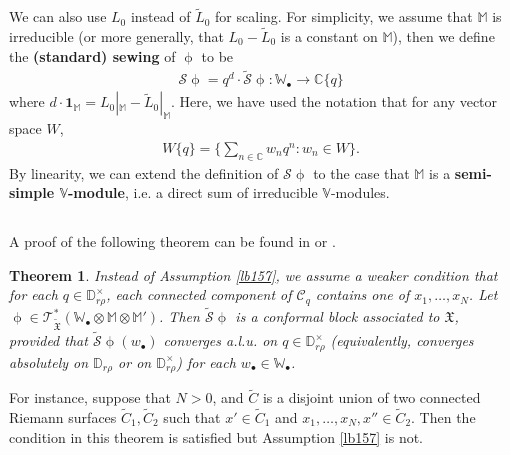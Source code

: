 \documentclass[12pt,a4paper,notitlepage]{article}
\theoremstyle{definition}
\theoremstyle{plain}
\newtheorem{thm}[df]{Theorem}
\newcommand{\fk}{\mathfrak}
\newcommand{\mc}{\mathcal}
\newcommand{\wtd}{\widetilde}
\newcommand{\id}{\mathbf{1}}
\newcommand{\scr}{\mathscr}
\newcommand{\blt}{\bullet}
\newcommand{\Vbb}{\mathbb V}
\newcommand{\Wbb}{\mathbb W}
\newcommand{\Mbb}{\mathbb M}
\newcommand{\Cbb}{\mathbb C}
\newcommand{\Dbb}{\mathbb D}
\numberwithin{equation}{section}
\begin{document}
We can also use $L_0$ instead of $\wtd L_0$ for scaling. For simplicity, we assume that $\Mbb$ is irreducible (or more generally, that $L_0-\wtd L_0$ is a constant on $\Mbb$), then we define the \textbf{(standard) sewing} of $\upphi$ to be \index{S@$\mc S\upphi$, the standard sewing}
\begin{align}
\mc S\upphi=q^d\cdot\wtd{\mc S}\upphi:\Wbb_\blt\rightarrow\Cbb\{q\} 
\end{align} 
where $d\cdot \id_\Mbb=L_0|_\Mbb-\wtd L_0|_\Mbb$. Here, we have used the notation that for any vector space $W$, 
\begin{align*}
W\{q\}=\Big\{\sum_{n\in\Cbb} w_nq^n:w_n\in W\Big\}.
\end{align*}
By linearity, we can extend the definition of $\mc S\upphi$ to the case that $\Mbb$ is a \textbf{semi-simple $\Vbb$-module},  i.e. a direct sum of irreducible $\Vbb$-modules.


\subsection{}

A proof of the following theorem can be found in \cite[Sec. 3.3]{Gui} or \cite[Sec. 10, 11]{Gui20}.

\begin{thm}\label{lb159}
Instead of Assumption \ref{lb157}, we assume a weaker condition that for each $q\in\Dbb_{r\rho}^\times$, each connected component of $\mc C_q$ contains one of $x_1,\dots,x_N$. Let $\upphi\in\scr T^*_{\wtd{\fk X}}(\Wbb_\blt\otimes\Mbb\otimes\Mbb')$. Then $\wtd{\mc S}\upphi$ is a conformal block associated to $\fk X$, provided that  $\wtd{\mc S}\upphi(w_\blt)$ converges a.l.u. on $q\in\Dbb_{r\rho}^\times$ (equivalently, converges absolutely on $\Dbb_{r\rho}$ or on $\Dbb_{r\rho}^\times$) for each $w_\blt\in\Wbb_\blt$.
\end{thm}

For instance, suppose that $N>0$, and $\wtd C$ is a disjoint union of two connected Riemann surfaces $\wtd C_1,\wtd C_2$ such that  $x'\in\wtd C_1$ and $x_1,\dots,x_N,x''\in\wtd C_2$. Then the condition in this theorem is satisfied but Assumption \ref{lb157} is not.
\end{document}
